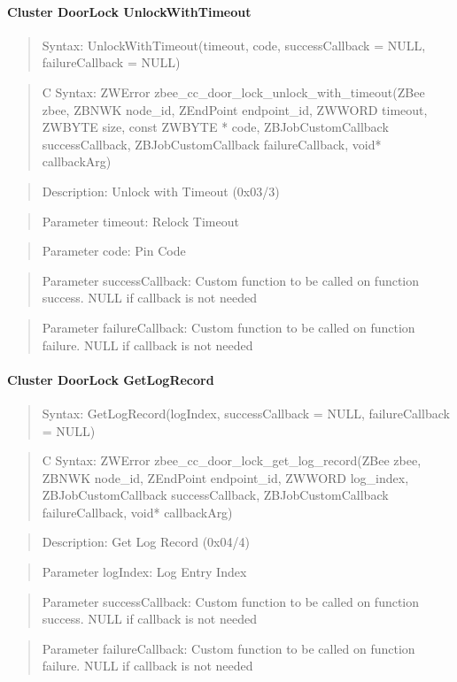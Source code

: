 \paragraph{Cluster DoorLock UnlockWithTimeout}
\begin{quote}Syntax: UnlockWithTimeout(timeout, code, successCallback = NULL, failureCallback = NULL)\end{quote}
\begin{quote}C Syntax: ZWError zbee\_cc\_door\_lock\_unlock\_with\_timeout(ZBee zbee, ZBNWK node\_id, ZEndPoint endpoint\_id, ZWWORD timeout, ZWBYTE size, const ZWBYTE * code, ZBJobCustomCallback successCallback, ZBJobCustomCallback failureCallback, void* callbackArg)\end{quote}
\begin{quote}Description: Unlock with Timeout (0x03/3)\end{quote}
\begin{quote}Parameter timeout: Relock Timeout\end{quote}
\begin{quote}Parameter code: Pin Code\end{quote}
\begin{quote}Parameter successCallback: Custom function to be called on function success. NULL if callback is not needed\end{quote}
\begin{quote}Parameter failureCallback: Custom function to be called on function failure. NULL if callback is not needed\end{quote}


\paragraph{Cluster DoorLock GetLogRecord}
\begin{quote}Syntax: GetLogRecord(logIndex, successCallback = NULL, failureCallback = NULL)\end{quote}
\begin{quote}C Syntax: ZWError zbee\_cc\_door\_lock\_get\_log\_record(ZBee zbee, ZBNWK node\_id, ZEndPoint endpoint\_id, ZWWORD log\_index, ZBJobCustomCallback successCallback, ZBJobCustomCallback failureCallback, void* callbackArg)\end{quote}
\begin{quote}Description: Get Log Record (0x04/4)\end{quote}
\begin{quote}Parameter logIndex: Log Entry Index\end{quote}
\begin{quote}Parameter successCallback: Custom function to be called on function success. NULL if callback is not needed\end{quote}
\begin{quote}Parameter failureCallback: Custom function to be called on function failure. NULL if callback is not needed\end{quote}


